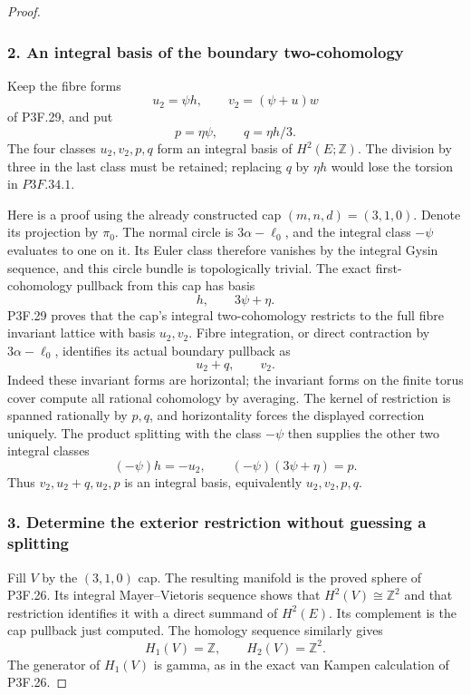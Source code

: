 \begin{proof}
\subsubsection{2. An integral basis of the boundary two-cohomology}\label{an-integral-basis-of-the-boundary-two-cohomology}

Keep the fibre forms \[
 u_2=\psi h,\qquad v_2=(\psi+u)w
\] of P3F.29, and put \[
                 p=\eta\psi,\qquad q=\eta h/3.
\] The four classes \(u_2,v_2,p,q\) form an integral basis of \(H^2(E;\mathbb Z)\). The division by three in the last class must be retained; replacing \(q\) by \(\eta h\) would lose the torsion in \(P3F.34.1\).

Here is a proof using the already constructed cap \((m,n,d)=(3,1,0)\). Denote its projection by \(\pi_0\). The normal circle is \(3\alpha-\ell_0\), and the integral class \(-\psi\) evaluates to one on it. Its Euler class therefore vanishes by the integral Gysin sequence, and this circle bundle is topologically trivial. The exact first-cohomology pullback from this cap has basis \[
                      h,\qquad 3\psi+\eta.
\] P3F.29 proves that the cap's integral two-cohomology restricts to the full fibre invariant lattice with basis \(u_2,v_2\). Fibre integration, or direct contraction by \(3\alpha-\ell_0\), identifies its actual boundary pullback as \[
                    u_2+q,\qquad v_2.
\] Indeed these invariant forms are horizontal; the invariant forms on the finite torus cover compute all rational cohomology by averaging. The kernel of restriction is spanned rationally by \(p,q\), and horizontality forces the displayed correction uniquely. The product splitting with the class \(-\psi\) then supplies the other two integral classes \[
 (-\psi)h=-u_2,\qquad
 (-\psi)(3\psi+\eta)=p.
\] Thus \(v_2,u_2+q,u_2,p\) is an integral basis, equivalently \(u_2,v_2,p,q\).

\subsubsection{3. Determine the exterior restriction without guessing a splitting}\label{determine-the-exterior-restriction-without-guessing-a-splitting}

Fill \(V\) by the \((3,1,0)\) cap. The resulting manifold is the proved sphere of P3F.26. Its integral Mayer--Vietoris sequence shows that \(H^2(V)\cong\mathbb Z^2\) and that restriction identifies it with a direct summand of \(H^2(E)\). Its complement is the cap pullback just computed. The homology sequence similarly gives \[
 H_1(V)=\mathbb Z,\qquad H_2(V)=\mathbb Z^2.
\] The generator of \(H_1(V)\) is gamma, as in the exact van Kampen calculation of P3F.26.


\end{proof}
